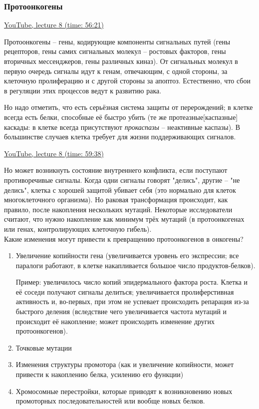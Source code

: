 \documentclass[main.tex]{subfiles}
\begin{document}
\subsubsection{Протоонкогены} 

\href{https://youtu.be/zbtDvIQ53lA?t=3381}{YouTube, lecture 8 (time: 56:21)}

Протоонкогены -- гены, кодирующие компоненты сигнальных путей (гены рецепторов, гены самих сигнальных молекул -- ростовых факторов, гены вторичных мессенджеров, гены различных киназ).
От сигнальных молекул в первую очередь сигналы идут к генам, отвечающим, с одной стороны, за клеточную пролиферацию и с другой стороны за апоптоз.
Естественно, что сбои в регуляции этих процессов ведут к развитию рака.

Но надо отметить, что есть серьёзная система защиты от перерождений; в клетке всегда есть белки, способные её быстро убить (те же протеазные[каспазные] каскады: в клетке всегда присутствуют \emph{прокаспазы} -- неактивные каспазы).
В большинстве случаев клетка требует для жизни поддерживающих сигналов.

\href{https://youtu.be/zbtDvIQ53lA?t=3578}{YouTube, lecture 8 (time: 59:38)}

Но может возникнуть состояние внутреннего конфликта, если поступают противоречивые сигналы.
Когда одни сигналы говорят "делись", другие -- "не делись", клетка с хорошей защитой убивает себя (это нормально для клеток многоклеточного организма).
Но раковая трансформация происходит, как правило, после накопления нескольких мутаций.
Некоторые исследователи считают, что нужно накопление как минимум трёх мутаций (в протоонкогенах или генах, контролирующих клеточную гибель). \\

Какие изменения могут привести к превращению протоонкогенов в онкогены?

\begin{enumerate}[noitemsep]
	\item Увеличение копийности гена (увеличивается уровень его экспрессии; все паралоги работают, в клетке накапливается большое число продуктов-белков).
	
	Пример: увеличилось число копий эпидермального фактора роста.
	Клетка и её соседи получают сигналы делиться; увеличивается пролиферстивная активность и, во-первых, при этом не успевает происходить репарация из-за быстрого деления (вследствие чего увеличивается частота мутаций и происходит её накопление; может происходить изменение других протоонкогенов).
	
	\item Точковые мутации
	\item Изменения структуры промотора (как и увеличение копийности, может привести к накоплению белка, усилению его функции)
	\item Хромосомные перестройки, которые приводят к возникновению новых промоторных последовательностей или вообще новых белков.
\end{enumerate}
\end{document}
